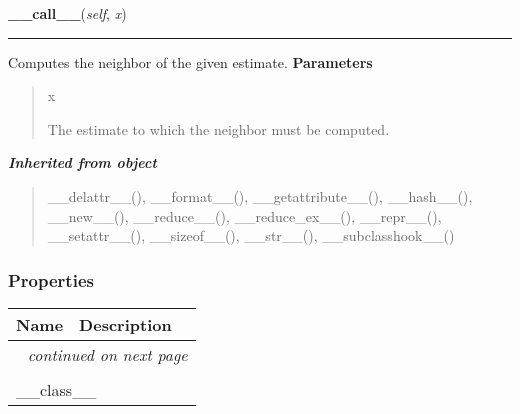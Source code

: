 \hspace{.8\funcindent}\begin{boxedminipage}{\funcwidth}

    \raggedright \textbf{\_\_call\_\_}(\textit{self}, \textit{x})

    \vspace{-1.5ex}

    \rule{\textwidth}{0.5\fboxrule}
\setlength{\parskip}{2ex}

Computes the neighbor of the given estimate.
\setlength{\parskip}{1ex}
      \textbf{Parameters}
      \vspace{-1ex}

      \begin{quote}
        \begin{Ventry}{x}

          \item[x]


The estimate to which the neighbor must be computed.
        \end{Ventry}

      \end{quote}

    \end{boxedminipage}


\large{\textbf{\textit{Inherited from object}}}

\begin{quote}
\_\_delattr\_\_(), \_\_format\_\_(), \_\_getattribute\_\_(), \_\_hash\_\_(), \_\_new\_\_(), \_\_reduce\_\_(), \_\_reduce\_ex\_\_(), \_\_repr\_\_(), \_\_setattr\_\_(), \_\_sizeof\_\_(), \_\_str\_\_(), \_\_subclasshook\_\_()
\end{quote}


  \subsubsection{Properties}

    \vspace{-1cm}
\hspace{\varindent}\begin{longtable}{|p{\varnamewidth}|p{\vardescrwidth}|l}
\cline{1-2}
\cline{1-2} \centering \textbf{Name} & \centering \textbf{Description}& \\
\cline{1-2}
\endhead\cline{1-2}\multicolumn{3}{r}{\small\textit{continued on next page}}\\\endfoot\cline{1-2}
\endlastfoot\multicolumn{2}{|l|}{\textit{Inherited from object}}\\
\multicolumn{2}{|p{\varwidth}|}{\raggedright \_\_class\_\_}\\
\cline{1-2}
\end{longtable}

